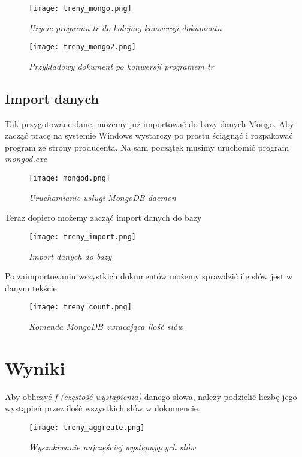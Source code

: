 \documentclass[a4paper]{article}
\begin{document}
\begin{figure}[h!]
\texttt{[image: treny\_mongo.png]}
\caption{\textit{Użycie programu tr do kolejnej konwersji dokumentu}}
\end{figure}



\begin{figure}[h!]
\texttt{[image: treny\_mongo2.png]}
\caption{\textit{Przykładowy dokument po konwersji programem tr}}
\end{figure}




\subsection {Import danych}
\hspace{1cm}Tak przygotowane dane, możemy już importować do bazy danych Mongo. Aby zacząć pracę na systemie Windows wystarczy po prostu ściągnąć i rozpakować program ze strony producenta. Na sam początek musimy uruchomić program \textit{mongod.exe}

\begin{figure}[h!]
\texttt{[image: mongod.png]}
\caption{\textit{Uruchamianie usługi MongoDB daemon}}
\end{figure}

Teraz dopiero możemy zacząć import danych do bazy


\begin{figure}[h!]
\texttt{[image: treny\_import.png]}
\caption{\textit{Import danych do bazy}}
\end{figure}


Po zaimportowaniu wszystkich dokumentów możemy sprawdzić ile słów jest w danym tekście

\begin{figure}[h!]
\texttt{[image: treny\_count.png]}
\caption{\textit{Komenda MongoDB zwracająca ilość słów}}
\end{figure}


\section{Wyniki}


\hspace{1cm}Aby obliczyć \textit{f (częstość wystąpienia)} danego słowa, należy podzielić liczbę jego wystąpień przez ilość wszystkich słów w dokumencie.

\begin{figure}[h!]
\texttt{[image: treny\_aggreate.png]}
\caption{\textit{Wyszukiwanie najczęściej występujących słów}}
\end{figure}
\end{document}
